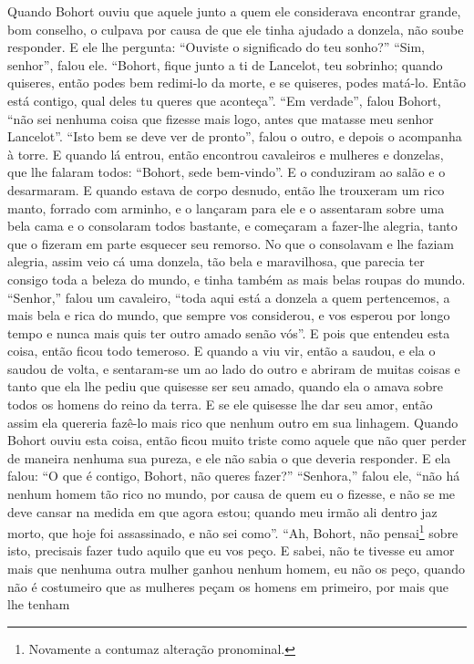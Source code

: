 Quando Bohort ouviu que aquele junto a quem ele considerava encontrar grande,
bom conselho, o culpava por causa de que ele tinha ajudado a donzela, não soube
responder. E ele lhe pergunta: “Ouviste o significado do teu sonho?” “Sim,
senhor”, falou ele. “Bohort, fique junto a ti de Lancelot, teu sobrinho;
quando quiseres, então podes bem redimi-lo da morte, e se quiseres, podes
matá-lo. Então está contigo, qual deles tu queres que aconteça”. “Em
verdade”, falou Bohort, “não sei nenhuma coisa que fizesse mais logo, antes que
matasse meu senhor Lancelot”. “Isto bem se deve ver de pronto”, falou o outro,
e depois o acompanha à torre. E quando lá entrou, então encontrou cavaleiros e
mulheres e donzelas, que lhe falaram todos: “Bohort, sede bem-vindo”. E o
conduziram ao salão e o desarmaram. E quando estava de corpo desnudo, então lhe
trouxeram um rico manto, forrado com arminho, e o lançaram para ele e o
assentaram sobre uma bela cama e o consolaram todos bastante, e começaram a
fazer-lhe alegria, tanto que o fizeram em parte esquecer seu remorso. No que o
consolavam e lhe faziam alegria, assim veio cá uma donzela, tão bela e
maravilhosa, que parecia ter consigo toda a beleza do mundo, e tinha também as
mais belas roupas do mundo. “Senhor,” falou um cavaleiro, “toda aqui está a
donzela a quem pertencemos, a mais bela e rica do mundo, que sempre vos
considerou, e vos esperou por longo tempo e nunca mais quis ter outro amado
senão vós”. E pois que entendeu esta coisa, então ficou todo temeroso. E quando
a viu vir, então a saudou, e ela o saudou de volta, e sentaram-se um ao lado do
outro e abriram de muitas coisas e tanto que ela lhe pediu que quisesse ser seu
amado, quando ela o amava sobre todos os homens do reino da terra. E se ele
quisesse lhe dar seu amor, então assim ela quereria fazê-lo mais rico que
nenhum outro em sua linhagem. Quando Bohort ouviu esta coisa, então
ficou muito triste como aquele que não quer perder de maneira nenhuma
sua pureza, e ele não sabia o que deveria responder. E ela falou: “O
que é contigo, Bohort, não queres fazer?” “Senhora,” falou ele, “não há nenhum
homem tão rico no mundo, por causa de quem eu o fizesse, e não se me deve
cansar na medida em que agora estou; quando meu irmão ali dentro jaz morto, que
hoje foi assassinado, e não sei como”. “Ah, Bohort, não pensai\footnote{
Novamente a contumaz alteração pronominal. } sobre isto, precisais
fazer tudo aquilo que eu vos peço. E sabei, não te tivesse eu amor mais que
nenhuma outra mulher ganhou nenhum homem, eu não os peço, quando não é
costumeiro que as mulheres peçam os homens em primeiro, por mais que lhe tenham
